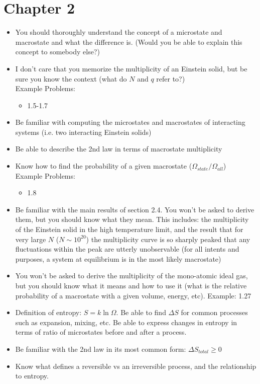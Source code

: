 \documentclass{article}
\begin{document}
\section*{Chapter 2}
\begin{itemize}
	\item You should thoroughly understand the concept of a microstate and macrostate and what the difference is. (Would you be able to explain this concept to somebody else?)
	\item I don't care that you memorize the multiplicity of an Einstein solid, but be sure you know the context (what do $N$ and $q$ refer to?)\\
	Example Problems:
	\begin{itemize}
		\item 1.5-1.7
	\end{itemize}
	\item Be familiar with computing the microstates and macrostates of interacting systems (i.e. two interacting Einstein solids)
	\item Be able to describe the 2nd law in terms of macrostate multiplicity
	\item Know how to find the probability of a given macrostate ($\Omega_{state}/\Omega_{all}$)\\
		Example Problems:
	\begin{itemize}
		\item 1.8
	\end{itemize}
	\item Be familiar with the main results of section 2.4. You won't be asked to derive them, but you should know what they mean. This includes: the multiplicity of the Einstein solid in the high temperature limit, and the result that for very large $N$ ($N\sim10^{20}$) the multiplicity curve is so sharply peaked that any fluctuations within the peak are utterly unobservable (for all intents and purposes, a system at equilibrium is in the most likely macrostate)
	\item You won't be asked to derive the multiplicity of the mono-atomic ideal gas, but you should know what it means and how to use it (what is the relative probability of a macrostate with a given volume, energy, etc). Example: 1.27
	\item Definition of entropy: $S=k\ln\Omega$. Be able to find $\Delta S$ for common processes such as expansion, mixing, etc. Be able to express changes in entropy in terms of ratio of microstates before and after a process.
	\item Be familiar with the 2nd law in its most common form: $\Delta S_{total} \geq 0$
	\item Know what defines a reversible vs an irreversible process, and the relationship to entropy.
\end{itemize}
\end{document}
